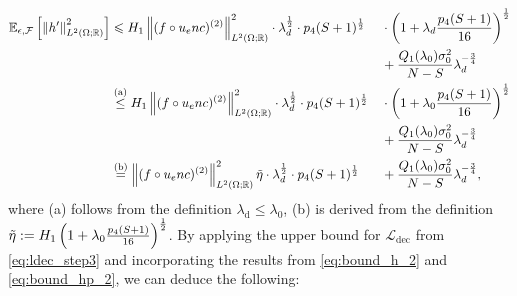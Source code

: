 \documentclass{article}
\def\encs{u_\textrm{enc}}
\def\declamb{\lambda_\textrm{d}}
\def\ldec{\mathcal{L}_\textrm{dec}}
\def\stset{\mathcal{F}}
\newcommand{\norm}[1]{\left\lVert#1\right\rVert}
\newcommand{\lp}[1]{{L}^{#1}\left(\Omega; \mathbb{R}\right)}
\newcommand{\lec}[2]{\stackrel{\text{#1}}{#2}}
\begin{document}
\begin{alignat}{2}\label{eq:bound_hp_2}
    \mathbb{E}_{\epsilon, \stset}\left[\norm{h'}^2_{\lp{2}}\right] &\leqslant H_1\norm{(f\circ\encs)^{(2)}}^2_{\lp{2}}\cdot\declamb^{\frac{1}{2}}\cdot p_4(S+1)^{\frac{1}{2}} &&\cdot\left(1 + \declamb\frac{p_4(S+1)}{16}\right)^{\frac{1}{2}} \nonumber \\ 
    & &&+  \frac{Q_1(\lambda_0)\sigma_0^2}{N-S}\declamb^{-\frac{3}{4}} \nonumber \\ 
    &\lec{(a)}{\leq} H_1\norm{(f\circ\encs)^{(2)}}^2_{\lp{2}}\cdot\declamb^{\frac{1}{2}}\cdot p_4(S+1)^{\frac{1}{2}} &&\cdot\left(1 + \lambda_0\frac{p_4(S+1)}{16}\right)^{\frac{1}{2}} \nonumber \\ 
    & &&+ \frac{Q_1(\lambda_0)\sigma_0^2}{N-S}\declamb^{-\frac{3}{4}} \nonumber \\ 
    &\lec{(b)}{=} \norm{(f\circ\encs)^{(2)}}^2_{\lp{2}} \Tilde{\eta}\cdot\declamb^{\frac{1}{2}}\cdot p_4(S+1)^{\frac{1}{2}} &&+  \frac{Q_1(\lambda_0)\sigma_0^2}{N-S}\declamb^{-\frac{3}{4}},
\end{alignat}
where (a) follows from the definition $\declamb \leqslant \lambda_0$, (b) is derived from the definition $\Tilde{\eta} := H_1\left(1 + \lambda_0\frac{p_4(S+1)}{16}\right)^{\frac{1}{2}}$. By applying the upper bound for $\ldec$ from \eqref{eq:ldec_step3} and incorporating the results from \eqref{eq:bound_h_2} and \eqref{eq:bound_hp_2}, we can deduce the following:
\end{document}
